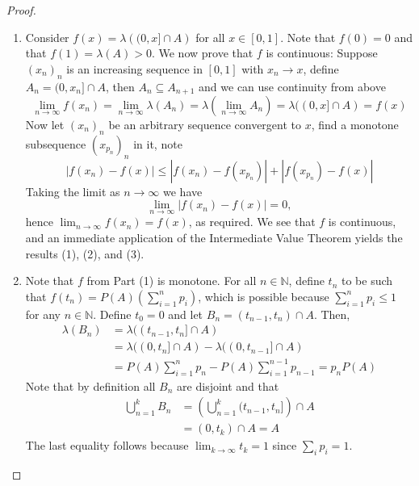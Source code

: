 \documentclass[11pt]{article}
\newcommand{\N}{\mathbb{N}}
\newcommand{\seq}{\subseteq}
\newcommand{\ic}{\cap}
\newcommand{\abs}[1]{\left\lvert#1\right\rvert}
\begin{document}
\begin{proof}
    \begin{enumerate} 
        \item Consider $f(x) = \lambda \left ( (0, x] \ic A \right )$ for all $x \in [0, 1]$. Note that $f(0) = 0$ and that $f(1) = \lambda (A) > 0$. We now prove that $f$ is continuous: Suppose $(x_n)_n$ is an increasing sequence in $[0, 1]$ with $x_n \to x$, define $A_n = (0, x_n] \ic A$, then $A_n \seq A_{n+1}$ and we can use continuity from above  
        \[ \lim_{n \to \infty} f(x_n) = \lim_{n \to \infty} \lambda (A_n) = \lambda \left ( \lim_{n \to \infty} A_n \right) = \lambda ((0, x] \ic A) = f(x) \]
        Now let $(x_n)_n$ be an arbitrary sequence convergent to $x$, find a monotone subsequence $(x_{p_n})_n$ in it, note
        \[ \abs{f(x_n) - f(x)} \leq \abs{f(x_n) - f(x_{p_n})} + \abs{f(x_{p_n}) - f(x)} \]
        Taking the limit as $n \to \infty$ we have
        \[ \lim_{n \to \infty} \abs{f(x_n) - f(x)} = 0, \]
        hence $\lim_{n \to \infty} f(x_n) = f(x)$, as required. We see that $f$ is continuous, and an immediate application of the Intermediate Value Theorem yields the results (1), (2), and (3).
        \item Note that $f$ from Part (1) is monotone. For all $n \in \N$, define $t_n$ to be such that $f(t_n) = P(A) \left ( \sum_{i=1}^{n} p_{i} \right )$, which is possible because $\sum_{i=1}^{n} p_{i} \leq 1$ for any $n \in \N$. Define $t_0 = 0$ and let $B_n = (t_{n-1}, t_n) \ic A$. Then,
        \begin{align*}
            \lambda (B_n) &= \lambda ((t_{n-1}, t_n] \ic A) \\
            &= \lambda ((0, t_n] \ic A) - \lambda ((0, t_{n-1}] \ic A) \\
            &= P(A) \sum_{i=1}^{n} p_n - P(A) \sum_{i=1}^{n-1} p_{n-1} = p_n P(A)
        \end{align*}
        Note that by definition all $B_n$ are disjoint and that
        \begin{align*}
            \bigcup_{n=1}^{k} B_n &= \left ( \bigcup_{n=1}^{k} (t_{n-1}, t_n] \right ) \ic A \\
            &= (0, t_k) \ic A = A
        \end{align*}
        The last equality follows because $\lim_{k \to \infty} t_k = 1$ since $\sum_i p_i = 1$.
    \end{enumerate}
    

\end{proof}
\end{document}
